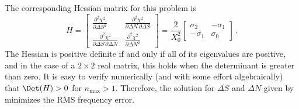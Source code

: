 The corresponding Hessian matrix for this problem is
 \begin{equation}
H = \begin{bmatrix}
      \frac{\partial^2 \chi^2}{\partial \Delta S^2} & \frac{\partial^2 \chi^2}{\partial \Delta N\, \partial \Delta S} \\
      \frac{\partial^2 \chi^2}{\partial \Delta S\, \partial \Delta N} & \frac{\partial^2 \chi^2}{\partial \Delta N^2}
    \end{bmatrix}
  = \frac{2}{X_0^2} \begin{bmatrix}
      \sigma_2 & -\sigma_1 \\
      -\sigma_1 & \sigma_0
    \end{bmatrix}\, .
 \end{equation}
The Hessian is positive definite if and only if all of its eigenvalues are positive, and in the case of a $2 \times 2$ real matrix, this holds when the determinant is greater than zero. It is easy to verify numerically (and with some effort algebraically) that $\Det(H) > 0$ for $n_\text{max} > 1$. Therefore, the solution for $\Delta S$ and $\Delta N$ given by  minimizes the RMS frequency error.

